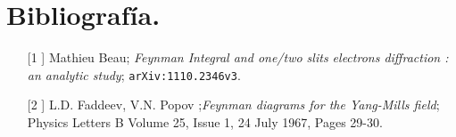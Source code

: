 \chapter{Bibliografía.}
\begin{itemize}
\item[[1]] Mathieu Beau; \textit{Feynman Integral and one/two slits electrons diffraction : an analytic study}; \texttt{arXiv:1110.2346v3}.
\item[[2]]  L.D. Faddeev,  V.N. Popov ;\textit{Feynman diagrams for the Yang-Mills field}; Physics Letters B Volume 25, Issue 1, 24 July 1967, Pages 29-30.

\end{itemize}